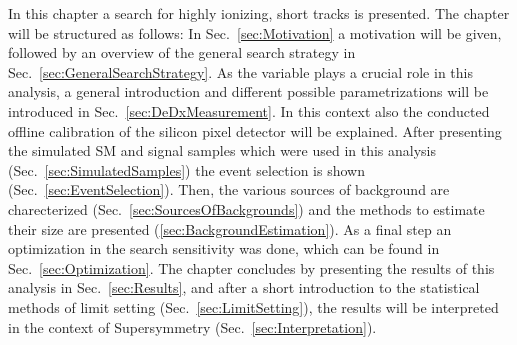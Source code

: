 
In this chapter a search for highly ionizing, short tracks is presented. The chapter will be structured as follows:
In \mbox{Sec.~\ref{sec:Motivation}} a motivation will be given, followed by an overview of the general search strategy in \mbox{Sec.~\ref{sec:GeneralSearchStrategy}}.
As the variable \dedx plays a crucial role in this analysis, a general introduction and different possible parametrizations will be introduced in \mbox{Sec.~\ref{sec:DeDxMeasurement}}.
In this context also the conducted offline calibration of the silicon pixel detector will be explained.
After presenting the simulated SM and signal samples which were used in this analysis (\mbox{Sec.~\ref{sec:SimulatedSamples}}) the event selection is shown (Sec.~\ref{sec:EventSelection}).
Then, the various sources of background are charecterized (Sec.~\ref{sec:SourcesOfBackgrounds}) and the methods to estimate their size are presented (\ref{sec:BackgroundEstimation}).
As a final step an optimization in the search sensitivity was done, which can be found in Sec.~\ref{sec:Optimization}.
The chapter concludes by presenting the results of this analysis in Sec.~\ref{sec:Results}, and after a short introduction to the statistical methods of limit setting (Sec.~\ref{sec:LimitSetting}), the results will be interpreted in the context of Supersymmetry (Sec.~\ref{sec:Interpretation}).


